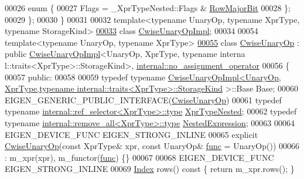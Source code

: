 \begin{DoxyCode}
00026   \textcolor{keyword}{enum} \{
00027     Flags = \_XprTypeNested::Flags & \hyperlink{group__flags_gae4f56c2a60bbe4bd2e44c5b19cbe8762}{RowMajorBit} 
00028   \};
00029 \};
00030 \}
00031 
00032 \textcolor{keyword}{template}<\textcolor{keyword}{typename} UnaryOp, \textcolor{keyword}{typename} XprType, \textcolor{keyword}{typename} StorageKind>
\hyperlink{class_eigen_1_1_cwise_unary_op_impl}{00033} \textcolor{keyword}{class }\hyperlink{class_eigen_1_1_cwise_unary_op_impl}{CwiseUnaryOpImpl};
00034 
00054 \textcolor{keyword}{template}<\textcolor{keyword}{typename} UnaryOp, \textcolor{keyword}{typename} XprType>
\hyperlink{group___core___module}{00055} \textcolor{keyword}{class }\hyperlink{group___core___module_class_eigen_1_1_cwise_unary_op}{CwiseUnaryOp} : \textcolor{keyword}{public} \hyperlink{class_eigen_1_1_cwise_unary_op_impl}{CwiseUnaryOpImpl}<UnaryOp, XprType, typename interna
      l::traits<XprType>::StorageKind>, \hyperlink{class_eigen_1_1internal_1_1no__assignment__operator}{internal::no\_assignment\_operator}
00056 \{
00057   \textcolor{keyword}{public}:
00058 
00059     \textcolor{keyword}{typedef} \textcolor{keyword}{typename} 
      \hyperlink{class_eigen_1_1_cwise_unary_op_impl}{CwiseUnaryOpImpl<UnaryOp, XprType,typename internal::traits<XprType>::StorageKind}
      >::Base Base;
00060     EIGEN\_GENERIC\_PUBLIC\_INTERFACE(\hyperlink{group___core___module_class_eigen_1_1_cwise_unary_op}{CwiseUnaryOp})
00061     \textcolor{keyword}{typedef} \textcolor{keyword}{typename} \hyperlink{class_eigen_1_1internal_1_1_tensor_lazy_evaluator_writable}{internal::ref\_selector<XprType>::type} 
      \hyperlink{class_eigen_1_1internal_1_1_tensor_lazy_evaluator_writable}{XprTypeNested};
00062     \textcolor{keyword}{typedef} \textcolor{keyword}{typename} \hyperlink{group___sparse_core___module}{internal::remove\_all<XprType>::type} 
      \hyperlink{group___sparse_core___module}{NestedExpression};
00063 
00064     EIGEN\_DEVICE\_FUNC EIGEN\_STRONG\_INLINE
00065     \textcolor{keyword}{explicit} \hyperlink{group___core___module_class_eigen_1_1_cwise_unary_op}{CwiseUnaryOp}(\textcolor{keyword}{const} XprType& xpr, \textcolor{keyword}{const} UnaryOp& \hyperlink{structfunc}{func} = UnaryOp())
00066       : m\_xpr(xpr), m\_functor(\hyperlink{structfunc}{func}) \{\}
00067 
00068     EIGEN\_DEVICE\_FUNC EIGEN\_STRONG\_INLINE
00069     \hyperlink{namespace_eigen_a62e77e0933482dafde8fe197d9a2cfde}{Index} rows()\textcolor{keyword}{ const }\{ \textcolor{keywordflow}{return} m\_xpr.rows(); \}

\end{DoxyCode}
